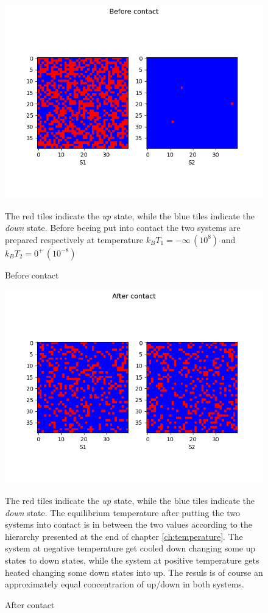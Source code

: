 \begin{figure}[htbp]
    \centering
    \includegraphics[scale=0.7]{./images/T1_T2_before.png}
    \caption{Before contact}{The red tiles indicate the \emph{up} state, while the blue tiles indicate the \emph{down} state. Before beeing put into contact
    the two systems are prepared respectively at temperature $k_B T_1 = -\infty \, (10^8)$ and $k_B T_2 = 0^+ \, (10^{-8})$}
    \label{fig:before}
\end{figure}

\begin{figure}[htbp]
    \centering
    \includegraphics[scale=0.7]{./images/T1_T2_after.png}
    \caption{After contact}{The red tiles indicate the \emph{up} state, while the blue tiles indicate the \emph{down} state. The equilibrium temperature after putting the two systems into contact is in between the two values according to the hierarchy presented 
    at the end of chapter \ref{ch:temperature}. The system at negative temperature get cooled down changing some up states to down states, while the system at positive temperature
    gets heated changing some down states into up. The resuls is of course an approximately equal concentrarion of up/down in both systems.}
    \label{fig:after}
\end{figure}